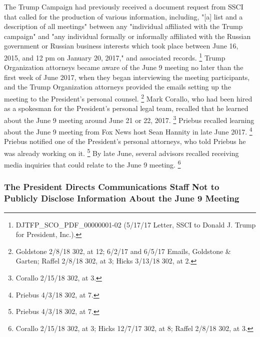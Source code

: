 The Trump Campaign had previously received a document request from SSCI that called for the production of various information, including, "[a] list and a description of all meetings" between any "individual affiliated with the Trump campaign" and "any individual formally or informally affiliated with the Russian government or Russian business interests which took place between June 16, 2015, and 12 pm on January 20, 2017," and associated records.%
\footnote{DJTFP\_SCO\_PDF\_00000001-02 (5/17/17 Letter, SSCI to Donald J. Trump for President, Inc.).}
Trump Organization attorneys became aware of the June 9 meeting no later than the first week of June 2017, when they began interviewing the meeting participants, and the Trump Organization attorneys provided the emails setting up the meeting to the President's personal counsel.%
\footnote{Goldstone 2/8/18 302, at 12;
6/2/17 and 6/5/17 Emails, Goldstone \& Garten;
Raffel 2/8/18 302, at 3;
Hicks 3/13/18 302, at 2.}
Mark Corallo, who had been hired as a spokesman for the President's personal legal team, recalled that he learned about the June 9 meeting around June 21 or 22, 2017.%
\footnote{Corallo 2/15/18 302, at 3.}
Priebus recalled learning about the June 9 meeting from Fox News host Sean Hannity in late June 2017.%
\footnote{Priebus 4/3/18 302, at 7.}
Priebus notified one of the President's personal attorneys, who told Priebus he was already working on it.%
\footnote{Priebus 4/3/18 302, at 7.}
By late June, several advisors recalled receiving media inquiries that could relate to the June 9 meeting.%
\footnote{Corallo 2/15/18 302, at 3;
Hicks 12/7/17 302, at 8;
Raffel 2/8/18 302, at 3.}

\subsubsection{The President Directs Communications Staff Not to Publicly Disclose Information About the June 9 Meeting}

